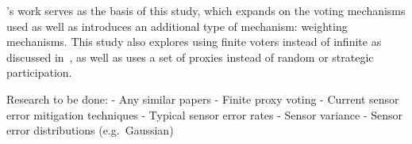 's work serves as the basis of this study, which expands on
the voting mechanisms used as well as introduces an additional type of
mechanism: weighting mechanisms.
This study also explores using finite voters instead of infinite as discussed
in~\cite{Cohensius2017}, as well as uses a set of proxies instead of random or
strategic participation.








Research to be done:
- Any similar papers
- Finite proxy voting
- Current sensor error mitigation techniques
- Typical sensor error rates
- Sensor variance
- Sensor error distributions (e.g.\ Gaussian)

